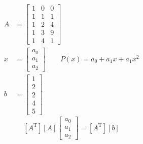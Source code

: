 \documentclass[11pt,a4paper,notitlepage,fleqn,draft]{article}
\begin{document}
    \begin{align*}
    	A &= \left[\begin{matrix}
   	    1 & 0 & 0 \\ 1 & 1 & 1 \\ 1 & 2 & 4 \\ 1 & 3 & 9 \\ 1 & 4 & 1
    	\end{matrix}\right] \\
    	x &= \left[\begin{matrix}
    	a_0 \\ a_1 \\ a_2
    	\end{matrix}\right] \qquad P(x) = a_0+a_1x+a_1x^2 \\
    	b &= \left[
    	\begin{matrix}
    	1 \\ 2 \\ 2 \\ 4 \\ 5
    	\end{matrix}
    	\right]
    \end{align*}
    \[
    \left[
    A^{\mathrm T}
    \right] \left[ A \right]\left[
    \begin{matrix}
    a_0 \\ a_1 \\ a_2
    \end{matrix}
    \right] = \left[A^{\mathrm T}\right] \left[b\right]
    \]
    
\end{document}
